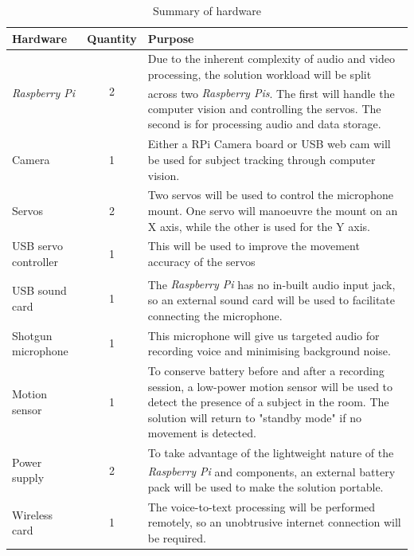 \documentclass[11pt,a4paper,titlepage]{report}
\newcommand{\rpi}{\textit{Raspberry Pi\textsuperscript{\textregistered}}}
\newcommand{\rpis}{\textit{Raspberry Pi\textsuperscript{\textregistered}s}}
\begin{document}
\begin{center}
\begin{table}
\begin{tabular}{ |l|c|p{6cm}| }
    \hline
    
    Hardware & Quantity & Purpose \\ \hline
    
    \rpi & 2 & Due to the inherent complexity of audio and video processing, the solution workload will be split across two \rpis. The first will handle the computer vision and controlling the servos. The second is for processing audio and data storage.\\ \hline

    Camera & 1 & Either a RPi Camera board or USB web cam will be used for subject tracking through computer vision. \\ \hline
    
    Servos & 2 & Two servos will be used to control the microphone mount. One servo will manoeuvre the mount on an X axis, while the other is used for the Y axis. \\ \hline
        
    USB servo controller & 1 & This will be used to improve the movement accuracy of the servos \\ \hline
    
    USB sound card & 1 & The \rpi\xspace has no in-built audio input jack, so an external sound card will be used to facilitate connecting the microphone. \\ \hline
    
    
    Shotgun microphone & 1 & This microphone will give us targeted audio for recording voice and minimising background noise. \\ \hline
    
    
    Motion sensor & 1 & To conserve battery before and after a recording session, a low-power motion sensor will be used to detect the presence of a subject in the room. The solution will return to "standby mode" if no movement is detected.\\ \hline

    Power supply & 2 & To take advantage of the lightweight nature of the \rpi\xspace and components, an external battery pack will be used to make the solution portable.\\ \hline


    Wireless card & 1 & The voice-to-text processing will be performed remotely, so an unobtrusive internet connection will be required.\\ \hline
    
\end{tabular}
\caption{Summary of hardware}
\label{table:hardwaretable}
\end{table}

\end{center}
\end{document}
